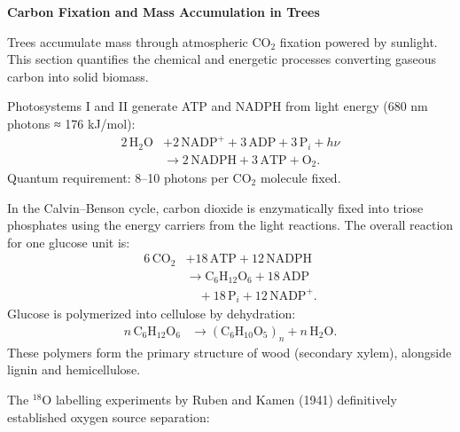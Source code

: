 \begin{technical}
{\Large\textbf{Carbon Fixation and Mass Accumulation in Trees}}

\vspace{0.3em}
\noindent Trees accumulate mass through atmospheric $\mathrm{CO}_2$ fixation powered by sunlight. This section quantifies the chemical and energetic processes converting gaseous carbon into solid biomass.

\vspace{0.5em}

\vspace{0.2em}
\noindent Photosystems I and II generate ATP and NADPH from light energy (680 nm photons ≈ 176 kJ/mol):
\begin{align*}
2\,\mathrm{H}_2\mathrm{O} 
&+ 2\,\mathrm{NADP}^+ 
+ 3\,\mathrm{ADP} 
+ 3\,\mathrm{P}_i 
+ h\nu \nonumber \\
&\rightarrow 2\,\mathrm{NADPH} 
+ 3\,\mathrm{ATP} 
+ \mathrm{O}_2.
\end{align*}
Quantum requirement: 8–10 photons per $\mathrm{CO}_2$ molecule fixed.

\vspace{0.5em}

\vspace{0.2em}
\noindent In the Calvin–Benson cycle, carbon dioxide is enzymatically fixed into triose phosphates using the energy carriers from the light reactions. The overall reaction for one glucose unit is:
\begin{align*}
6\,\mathrm{CO}_2 
&+ 18\,\mathrm{ATP} 
+ 12\,\mathrm{NADPH} \nonumber \\
&\rightarrow \mathrm{C}_6\mathrm{H}_{12}\mathrm{O}_6 
+ 18\,\mathrm{ADP} \nonumber \\
&\quad + 18\,\mathrm{P}_i 
+ 12\,\mathrm{NADP}^+.
\end{align*}
Glucose is polymerized into cellulose by dehydration:
\begin{align*}
n\,\mathrm{C}_6\mathrm{H}_{12}\mathrm{O}_6 
&\rightarrow (\mathrm{C}_6\mathrm{H}_{10}\mathrm{O}_5)_n 
+ n\,\mathrm{H}_2\mathrm{O}.
\end{align*}
These polymers form the primary structure of wood (secondary xylem), alongside lignin and hemicellulose.

\vspace{0.5em}

\vspace{0.2em}
\noindent The $^{18}\mathrm{O}$ labelling experiments by Ruben and Kamen (1941) definitively established oxygen source separation:


\end{technical}
